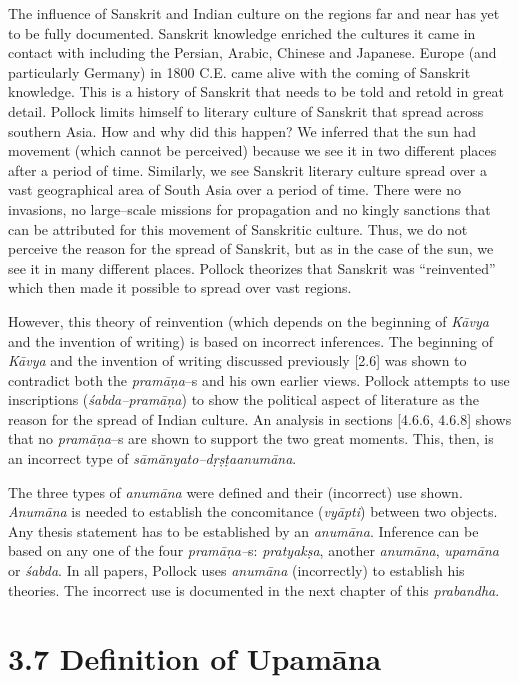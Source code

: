 The influence of Sanskrit and Indian culture on the regions far and near has yet to be fully documented. Sanskrit knowledge enriched the cultures it came in contact with including the Persian, Arabic, Chinese and Japanese. Europe (and particularly Germany) in 1800 C.E. came alive with the coming of Sanskrit knowledge. This is a history of Sanskrit that needs to be told and retold in great detail. Pollock limits himself to literary culture of Sanskrit that spread across southern Asia. How and why did this happen? We inferred that the sun had movement (which cannot be perceived) because we see it in two different places after a period of time. Similarly, we see Sanskrit literary culture spread over a vast geographical area of South Asia over a period of time. There were no invasions, no large–scale missions for propagation and no kingly sanctions that can be attributed for this movement of Sanskritic culture. Thus, we do not perceive the reason for the spread of Sanskrit, but as in the case of the sun, we see it in many different places. Pollock theorizes that Sanskrit was “reinvented” which then made it possible to spread over vast regions.

However, this theory of reinvention (which depends on the beginning of \textit{Kāvya} and the invention of writing) is based on incorrect inferences. The beginning of \textit{Kāvya} and the invention of writing discussed previously [2.6] was shown to contradict both the \textit{pramāṇa}–s and his own earlier views. Pollock attempts to use inscriptions (\textit{śabda–pramāṇa}) to show the political aspect of literature as the reason for the spread of Indian culture. An analysis in sections [4.6.6, 4.6.8] shows that no\textit{ pramāṇa}–s are shown to support the two great moments. This, then, is an incorrect type of \textit{sāmānyato–dṛṣṭaanumāna}.

The three types of \textit{anumāna }were defined and their (incorrect) use shown. \textit{Anumāna} is needed to establish the concomitance (\textit{vyāpti}) between two objects. Any thesis statement has to be established by an \textit{anumāna}. Inference can be based on any one of the four \textit{pramāṇa–}s: \textit{pratyakṣa}, another \textit{anumāna}, \textit{upamāna} or \textit{śabda}. In all papers, Pollock uses \textit{anumāna} (incorrectly) to establish his theories. The incorrect use is documented in the next chapter of this \textit{prabandha}.


\section*{3.7 Definition of Upamāna}

